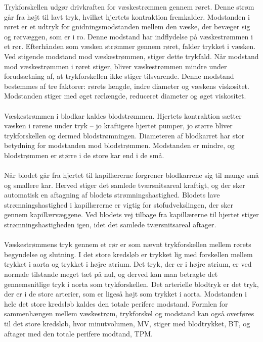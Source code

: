 Trykforskellen udgør drivkraften for væskestrømmen gennem røret. Denne strøm går fra højt til lavt tryk, hvilket hjertets kontraktion fremkalder. Modstanden i røret er et udtryk for gnidningsmodstanden mellem den væske, der bevæger sig og rørvæggen, som er i ro. Denne modstand har indflydelse på væskestrømmen i et rør. Efterhånden som væsken strømmer gennem røret, falder trykket i væsken. Ved stigende modstand mod væskestrømmen, stiger dette trykfald. Når modstand mod væskestrømmen i røret stiger, bliver væskestrømmen mindre under forudsætning af, at trykforskellen ikke stiger tilsvarende. Denne modstand bestemmes af tre faktorer: rørets længde, indre diameter og væskens viskositet. 
Modstanden stiger med øget rørlængde, reduceret diameter og øget viskositet. 
\\ \\
Væskestrømmen i blodkar kaldes blodstrømmen. Hjertets kontraktion sætter væsken i rørene under tryk – jo kraftigere hjertet pumper, jo større bliver trykforskellen og dermed blodstrømningen. Diameteren af blodkarret har stor betydning for modstanden mod blodstrømmen. Modstanden er mindre, og blodstrømmen er større i de store kar end i de små.
\\\\
Når blodet går fra hjertet til kapillærerne forgrener blodkarrene sig til mange små og smallere kar. Herved stiger det samlede tværsnitsareal kraftigt, og der sker automatisk en aftagning af blodets strømningshastighed. Blodets lave strømningshastighed i kapillærerne er vigtig for stofudvekslingen, der sker gennem kapillærvæggene. Ved blodets vej tilbage fra kapillærerne til hjertet stiger strømningshastigheden igen, idet det samlede tværsnitsareal aftager.
\\\\
Væskestrømmens tryk gennem et rør er som nævnt trykforskellen mellem rørets begyndelse og slutning. I det store kredsløb er trykket lig med forskellen mellem trykket i aorta og trykket i højre atrium. Det tryk, der er i højre atrium, er ved normale tilstande meget tæt på nul, og derved kan man betragte det gennemsnitlige tryk i aorta som trykforskellen. Det arterielle blodtryk er det tryk, der er i de store arterier, som er ligeså højt som trykket i aorta. Modstanden i hele det store kredsløb kaldes den totale perifere modstand. Formlen for sammenhængen mellem væskestrøm, trykforskel og modstand kan også overføres til det store kredsløb, hvor minutvolumen, MV, stiger med blodtrykket, BT, og aftager med den totale perifere modtand, TPM.


